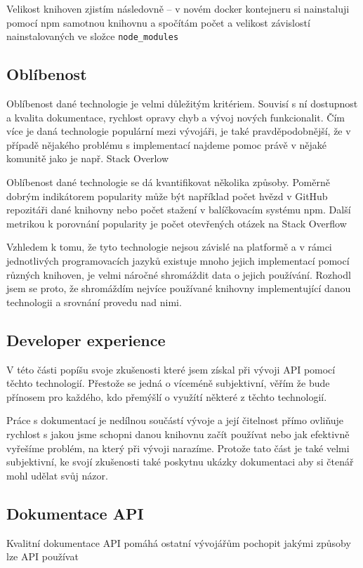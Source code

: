 \documentclass[thesis=M,czech]{FITthesis}[2019/12/23]
\begin{document}
Velikost knihoven zjistím následovně -- v novém docker kontejneru si nainstaluji pomocí npm samotnou knihovnu a spočítám počet a velikost závislostí nainstalovaných ve složce \texttt{node_modules}


\subsection{Oblíbenost}
Oblíbenost dané technologie je velmi důležitým kritériem. Souvisí s ní dostupnost a kvalita dokumentace, rychlost opravy chyb a vývoj nových funkcionalit. Čím více je daná technologie populární mezi vývojáři, je také pravděpodobnější, že v případě nějakého problému s implementací najdeme pomoc právě v nějaké komunitě jako je např. Stack Overlow%

Oblíbenost dané technologie se dá kvantifikovat několika způsoby. Poměrně dobrým indikátorem popularity může být například počet hvězd v GitHub repozitáři dané knihovny nebo počet stažení v balíčkovacím systému npm. Další metrikou k porovnání popularity je počet otevřených otázek na Stack Overflow

Vzhledem k tomu, že tyto technologie nejsou závislé na platformě a v rámci jednotlivých programovacích jazyků existuje mnoho jejich implementací pomocí různých knihoven, je velmi náročné shromáždit data o jejich používání. Rozhodl jsem se proto, že shromáždím nejvíce používané knihovny implementující danou technologii a srovnání provedu nad nimi.

\subsection{Developer experience}
V této části popíšu svoje zkušenosti které jsem získal při vývoji API pomocí těchto technologií. Přestože se jedná o víceméně subjektivní, věřím že bude přínosem pro každého, kdo přemýšlí o využítí některé z těchto technologií.

Práce s dokumentací je nedílnou součástí vývoje a její čitelnost přímo ovliňuje rychlost s jakou jsme schopni danou knihovnu začít používat nebo jak efektivně vyřešíme problém, na který při vývoji narazíme. Protože tato část je také velmi subjektivní, ke svojí zkušenosti také poskytnu ukázky dokumentaci aby si čtenář mohl udělat svůj názor. 

\subsection{Dokumentace API}
Kvalitní dokumentace API pomáhá ostatní vývojářům pochopit jakými způsoby lze API používat
\end{document}
